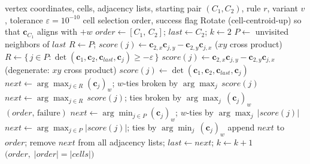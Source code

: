 \documentclass[12pt]{article}
\theoremstyle{definition}
\begin{document}
\begin{algorithm}[tp]
\caption{Apple-Peel Unfolding (4D, global $\mathbf{c}_1$--$\mathbf{c}_2$ reference,
         rule $r\in\{\text{RS},\text{RZ}\}$,
         variant $v\in\{\text{w},\text{n}\}$).
         Variant w = with fallback; variant n = no fallback.}
\label{alg:peel4d}
\begin{algorithmic}[1]
\Require vertex coordinates, cells, adjacency lists,
         starting pair $(C_1,C_2)$, rule $r$, variant $v$,
         tolerance $\varepsilon=10^{-10}$
\Ensure cell selection order, success flag
\State Rotate (cell-centroid-up) so that $\mathbf{c}_{C_1}$ aligns with $+w$
\State $\mathit{order} \gets [C_1,\,C_2]$;\;
       $\mathit{last} \gets C_2$;\; $k \gets 2$
  \State $P \gets$ unvisited neighbors of $\mathit{last}$
    \State $R \gets P$;\quad
           $\mathit{score}(j) \gets \mathbf{c}_{2,x}\mathbf{c}_{j,y}-\mathbf{c}_{2,y}\mathbf{c}_{j,x}$
           \hfill ($xy$ cross product)
  \Else
    \State $R \gets \{\,j\in P : \det(\mathbf{c}_1,\mathbf{c}_2,\mathbf{c}_{\mathit{last}},\mathbf{c}_j)\ge -\varepsilon\,\}$
      \State $\mathit{score}(j) \gets \mathbf{c}_{2,x}\mathbf{c}_{j,y}-\mathbf{c}_{2,y}\mathbf{c}_{j,x}$
             \hfill (degenerate: $xy$ cross product)
    \Else
      \State $\mathit{score}(j) \gets \det(\mathbf{c}_1,\mathbf{c}_2,\mathbf{c}_{\mathit{last}},\mathbf{c}_j)$
    \EndIf
  \EndIf
      \State $\mathit{next} \gets \arg\max_{j\in R}(\mathbf{c}_j)_w$;\;
             $w$-ties broken by $\arg\max_j\,\mathit{score}(j)$
      \State $\mathit{next} \gets \arg\max_{j\in R}\,\mathit{score}(j)$;\;
             ties broken by $\arg\max_j\,(\mathbf{c}_j)_w$
    \EndIf
   
    \State \Return $(\mathit{order},\,\text{failure})$
  \Else {}
      \State $\mathit{next} \gets \arg\min_{j\in P}(\mathbf{c}_j)_w$;\;
             $w$-ties by $\arg\max_j\,|\mathit{score}(j)|$
      \State $\mathit{next} \gets \arg\max_{j\in P}|\mathit{score}(j)|$;\;
             ties by $\arg\min_j\,(\mathbf{c}_j)_w$
    \EndIf
  \EndIf
  \State append $\mathit{next}$ to $\mathit{order}$;\;
         remove $\mathit{next}$ from all adjacency lists;\;
         $\mathit{last} \gets \mathit{next}$;\; $k \gets k+1$
\EndWhile
\State \Return $\bigl(\mathit{order},\;|\mathit{order}|=|\mathit{cells}|\bigr)$
\end{algorithmic}
\end{algorithm}
\end{document}
